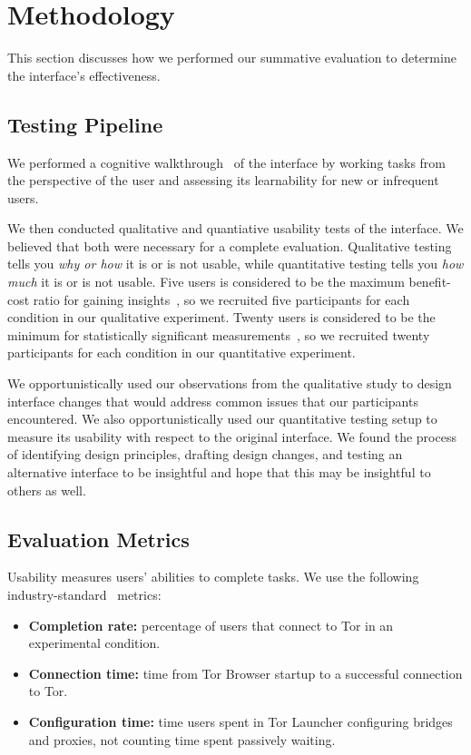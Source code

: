 \documentclass[USenglish,oneside,twocolumn]{article}
\begin{document}
\section{Methodology} 
This section discusses how we performed our summative evaluation to determine the interface's effectiveness.

\subsection{Testing Pipeline} 
We performed a cognitive walkthrough~\cite{cognitive-walkthrough} of the interface by working tasks from the perspective of the user and assessing its learnability for new or infrequent users.

We then conducted qualitative and quantiative usability tests of the interface. We believed that both were necessary for a complete evaluation. Qualitative testing tells you {\it why or how} it is or is not usable, while quantitative testing tells you {\it how much} it is or is not usable. Five users is considered to be the maximum benefit-cost ratio for gaining insights~\cite{howmanyusers}, so we recruited five participants for each condition in our qualitative experiment. Twenty users is considered to be the minimum for statistically significant measurements~\cite{howmanyusers}, so we recruited twenty participants for each condition in our quantitative experiment.

We opportunistically used our observations from the qualitative study to design interface changes that would address common issues that our participants encountered. We also opportunistically used our quantitative testing setup to measure its usability with respect to the original interface. We found the process of identifying design principles, drafting design changes, and testing an alternative interface to be insightful and hope that this may be insightful to others as well. 

\subsection{Evaluation Metrics}
\label{sec:eval}
Usability measures users' abilities to complete tasks. We use the following industry-standard~\cite{albert2013measuring} metrics: \\

\begin{itemize}
\item {\bfseries Completion rate:}  percentage of users that connect to Tor in an experimental condition. 
\item {\bfseries Connection time:} time from Tor Browser startup to a successful connection to Tor. 
\item {\bfseries Configuration time:} time users spent in Tor Launcher configuring bridges and proxies, not counting time spent passively waiting.
\end{itemize}
\end{document}
